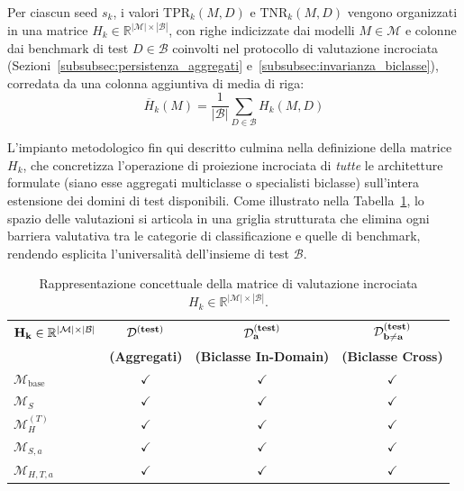 Per ciascun seed $s_k$, i valori $\text{TPR}_k(M,D)$ e $\text{TNR}_k(M,D)$ vengono organizzati in una matrice $H_k \in \mathbb{R}^{|\mathcal{M}| \times |\mathcal{B}|}$, con righe indicizzate dai modelli $M \in \mathcal{M}$ e colonne dai benchmark di test $D \in \mathcal{B}$ coinvolti nel protocollo di valutazione incrociata (Sezioni~\ref{subsubsec:persistenza_aggregati} e~\ref{subsubsec:invarianza_biclasse}), corredata da una colonna aggiuntiva di media di riga:
\begin{equation}
    \overline{H}_k(M) = \frac{1}{|\mathcal{B}|} \sum_{D \in \mathcal{B}} H_k(M, D)
    \label{eq:row_mean}
\end{equation}

L'impianto metodologico fin qui descritto culmina nella definizione della matrice $H_k$, che concretizza l'operazione di proiezione incrociata di \textit{tutte} le architetture formulate (siano esse aggregati multiclasse o specialisti biclasse) sull'intera estensione dei domini di test disponibili. Come illustrato nella Tabella~\ref{tab:matrice_incrociata}, lo spazio delle valutazioni si articola in una griglia strutturata che elimina ogni barriera valutativa tra le categorie di classificazione e quelle di benchmark, rendendo esplicita l'universalità dell'insieme di test $\mathcal{B}$.

\begin{table}[H]
    \centering
    \caption{Rappresentazione concettuale della matrice di valutazione incrociata $H_k \in \mathbb{R}^{|\mathcal{M}| \times |\mathcal{B}|}$.}
    \label{tab:matrice_incrociata}
    \begin{tabular}{l c c c}
    \toprule
    $\bf{H_k \in \mathbb{R}^{|\mathcal{M}| \times |\mathcal{B}|}}$ & $\bf{\mathcal{D}^{(\text{\bfseries test})}}$ & $\bf{\mathcal{D}_a^{(\text{\bfseries test})}}$ & $\bf{\mathcal{D}_{b\neq a}^{(\text{\bfseries test})}}$ \\[-5pt]
    & \textbf{(Aggregati)} & \textbf{(Biclasse In-Domain)} & \textbf{(Biclasse Cross)} \\
    \midrule
    $\mathcal{M}_{\text{base}}$ & $\checkmark$ & $\checkmark$ & $\checkmark$ \\
    $\mathcal{M}_S$            & $\checkmark$ & $\checkmark$ & $\checkmark$ \\
    $\mathcal{M}_H^{(T)}$      & $\checkmark$ & $\checkmark$ & $\checkmark$ \\
    $\mathcal{M}_{S,a}$        & $\checkmark$ & $\checkmark$ & $\checkmark$ \\
    $\mathcal{M}_{H,T,a}$      & $\checkmark$ & $\checkmark$ & $\checkmark$ \\
    \bottomrule
    \end{tabular}
\end{table}

